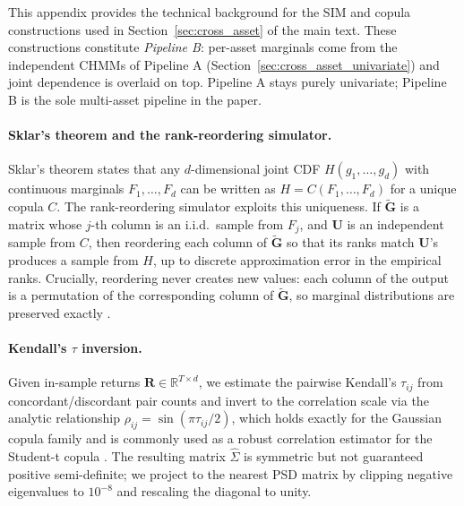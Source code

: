 This appendix provides the technical background for the SIM and copula constructions used in Section~\ref{sec:cross_asset} of the main text. These constructions constitute \emph{Pipeline B}: per-asset marginals come from the independent CHMMs of Pipeline A (Section~\ref{sec:cross_asset_univariate}) and joint dependence is overlaid on top. Pipeline A stays purely univariate; Pipeline B is the sole multi-asset pipeline in the paper.

\paragraph{Sklar's theorem and the rank-reordering simulator.}
Sklar's theorem \cite{sklar1959fonctions, nelsen2006introduction} states that any $d$-dimensional joint CDF $H(g_1, \dots, g_d)$ with continuous marginals $F_1, \dots, F_d$ can be written as $H = C(F_1, \dots, F_d)$ for a unique copula $C$.
The rank-reordering simulator exploits this uniqueness.
If $\tilde{\mathbf{G}}$ is a matrix whose $j$-th column is an i.i.d.\ sample from $F_j$, and $\mathbf{U}$ is an independent sample from $C$, then reordering each column of $\tilde{\mathbf{G}}$ so that its ranks match $\mathbf{U}$'s produces a sample from $H$, up to discrete approximation error in the empirical ranks.
Crucially, reordering never creates new values: each column of the output is a permutation of the corresponding column of $\tilde{\mathbf{G}}$, so marginal distributions are preserved exactly \cite{iman1982distribution}.

\paragraph{Kendall's $\tau$ inversion.}
Given in-sample returns $\mathbf{R} \in \mathbb{R}^{T \times d}$, we estimate the pairwise Kendall's $\tau_{ij}$ from concordant/discordant pair counts and invert to the correlation scale via the analytic relationship $\rho_{ij} = \sin(\pi \tau_{ij} / 2)$, which holds exactly for the Gaussian copula family and is commonly used as a robust correlation estimator for the Student-t copula \cite{embrechts2002correlation, mcneil2015quantitative}.
The resulting matrix $\hat{\Sigma}$ is symmetric but not guaranteed positive semi-definite; we project to the nearest PSD matrix by clipping negative eigenvalues to $10^{-8}$ and rescaling the diagonal to unity.

